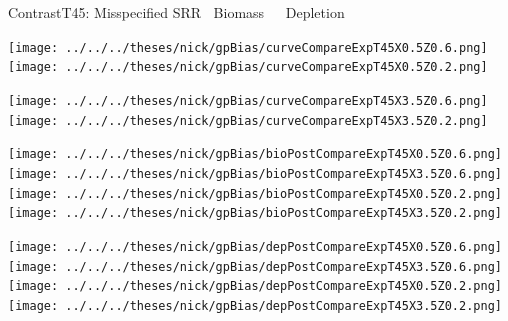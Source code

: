 \documentclass[ xcolor = pdftex, dvipsnames, table ]{beamer}
\begin{document}
%
\begin{frame}{ContrastT45: Misspecified SRR $~$ Biomass $~~~~$ Depletion}
$~$
\hspace*{-1.25cm}
\begin{minipage}[h!]{0.25\textwidth}
\texttt{[image: ../../../theses/nick/gpBias/curveCompareExpT45X0.5Z0.6.png]}\\
\texttt{[image: ../../../theses/nick/gpBias/curveCompareExpT45X0.5Z0.2.png]}
\end{minipage}
\begin{minipage}[h!]{0.25\textwidth}
\hspace*{0.45cm}
\texttt{[image: ../../../theses/nick/gpBias/curveCompareExpT45X3.5Z0.6.png]}\\
\hspace*{0.45cm}
\texttt{[image: ../../../theses/nick/gpBias/curveCompareExpT45X3.5Z0.2.png]}
\end{minipage}
\begin{minipage}[h!]{0.25\textwidth}
\vspace{-0.1cm}
\hspace*{1.5cm}
\texttt{[image: ../../../theses/nick/gpBias/bioPostCompareExpT45X0.5Z0.6.png]}\\
\hspace*{1.5cm}
\texttt{[image: ../../../theses/nick/gpBias/bioPostCompareExpT45X3.5Z0.6.png]}\\
\hspace*{1.5cm}
\texttt{[image: ../../../theses/nick/gpBias/bioPostCompareExpT45X0.5Z0.2.png]}\\
\hspace*{1.5cm}
\texttt{[image: ../../../theses/nick/gpBias/bioPostCompareExpT45X3.5Z0.2.png]}
\end{minipage}
\begin{minipage}[h!]{0.25\textwidth}
\vspace{-0.1cm}
\hspace*{1.5cm}
\texttt{[image: ../../../theses/nick/gpBias/depPostCompareExpT45X0.5Z0.6.png]}\\
\hspace*{1.5cm}
\texttt{[image: ../../../theses/nick/gpBias/depPostCompareExpT45X3.5Z0.6.png]}\\
\hspace*{1.5cm}
\texttt{[image: ../../../theses/nick/gpBias/depPostCompareExpT45X0.5Z0.2.png]}\\
\hspace*{1.5cm}
\texttt{[image: ../../../theses/nick/gpBias/depPostCompareExpT45X3.5Z0.2.png]}
\end{minipage}
\end{frame}
\end{document}
